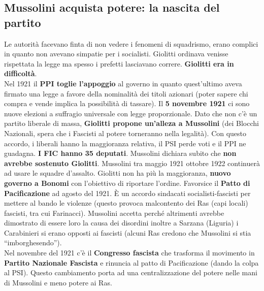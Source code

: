 \subsection{Mussolini acquista potere: la nascita del partito}
Le autorità facevano finta di non vedere i fenomeni di squadrismo, erano complici in quanto non 
avevano simpatie per i socialisti. Giolitti ordinava venisse rispettata la legge ma spesso i
prefetti lasciavano correre. \textbf{Giolitti era in difficoltà}.\\
Nel 1921 il \textbf{PPI toglie l'appoggio} al governo in quanto quest'ultimo aveva firmato una legge
a favore della nominalità dei titoli azionari (poter sapere chi compra e vende implica la possibilità
di tassare). Il \textbf{5 novembre 1921} ci sono nuove elezioni a suffragio universale con legge
proporzionale. Dato che non c'è un partito liberale di massa, \textbf{Giolitti propone un'alleza a
Mussolini} (dei Blocchi Nazionali, spera che i Fascisti al potere torneranno nella legalità). Con
questo accordo, i liberali hanno la maggioranza relativa, il PSI perde voti e il PPI ne guadagna.
\textbf{I FIC hanno 35 deputati}. Mussolini dichiara subito che \textbf{non avrebbe sostenuto 
Giolitti}. Mussolini tra maggio 1921 ottobre 1922 continuerà ad usare le squadre d'assalto. Giolitti
non ha più la maggioranza, \textbf{nuovo governo a Bonomi} con l'obiettivo di riportare l'ordine.
Favorsice il \textbf{Patto di Pacificazione} ad agosto del 1921. È un accordo sindacati 
socialisti-fascisti per mettere al bando le violenze (questo provoca malcontento dei Ras (capi 
locali) fascisti, tra cui Farinacci). Mussolini accetta perché altrimenti avrebbe dimostrato di 
essere loro la causa dei disordini inoltre a Sarzana (Liguria) i Carabinieri si erano opposti
ai fascisti (alcuni Ras credono che Mussolini si stia ``imborghesendo'').\\ [\baselineskip]
Nel novembre del 1921 c'è il \textbf{Congresso fascista} che trasforma il movimento in 
\textbf{Partito Nazionale Fascista} e rinuncia al patto di Pacificazione (dando la colpa al PSI).
Questo cambiamento porta ad una centralizzazione del potere nelle mani di Mussolini e meno potere
ai Ras.

